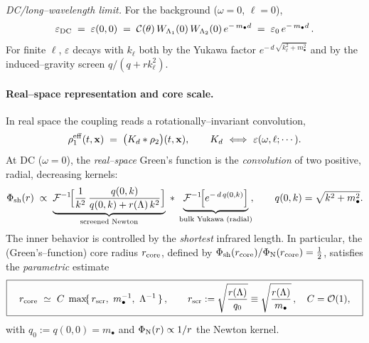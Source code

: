 \documentclass[10pt]{article}
\theoremstyle{definition}
\theoremstyle{plain}
\begin{document}
\emph{DC/long–wavelength limit.} For the background ($\omega=0$, $\ell=0$),
\begin{equation}
\label{eq:eps-DC}
\varepsilon_{\rm DC}\;=\;\varepsilon(0,0)\;=\;\mathcal C(\theta)\,W_{\Lambda_1}(0)\,W_{\Lambda_2}(0)\,
e^{-\,m_\bullet d}\;=\;\varepsilon_0\,e^{-\,m_\bullet d}\,.
\end{equation}
For finite $\ell$, $\varepsilon$ decays with $k_\ell$ both by the Yukawa factor
$e^{-\,d\,\sqrt{k_\ell^2+m_\bullet^2}}$ and by the induced–gravity screen
$q/(q+r k_\ell^2)$.

\paragraph{Real–space representation and core scale.}\label{par:uom-main-067}
In real space the coupling reads a rotationally–invariant convolution,
\begin{equation}
\label{eq:mirage-convolution}
\rho^{\rm eff}_1(t,\mathbf x)\;=\;\big(K_d * \rho_2\big)(t,\mathbf x),
\qquad
K_d\ \Longleftrightarrow\ \varepsilon(\omega,\ell;\cdots).
\end{equation}
At DC ($\omega=0$), the \emph{real–space} Green’s function is the \emph{convolution}
of two positive, radial, decreasing kernels:
\begin{equation}
\label{eq:conv-kernels}
\Phi_{\rm sh}(r)\;\propto\;\underbrace{\mathcal F^{-1}\!\Big[\frac{1}{k^2}\,\frac{q(0,k)}{q(0,k)+r(\Lambda)\,k^2}\Big]}_{\text{screened Newton}}\;\ast\;
\underbrace{\mathcal F^{-1}\!\Big[e^{-\,d\,q(0,k)}\Big]}_{\text{bulk Yukawa (radial)}}\!,
\qquad q(0,k)=\sqrt{k^2+m_\bullet^2}.
\end{equation}
The inner behavior is controlled by the \emph{shortest} infrared length. In
particular, the (Green’s–function) core radius $r_{\rm core}$, defined by
$\Phi_{\rm sh}(r_{\rm core})/\Phi_{\rm N}(r_{\rm core})=\tfrac12$, satisfies the
\emph{parametric} estimate
\begin{equation}
\label{eq:rcore-param}
\boxed{\quad
r_{\rm core}\ \simeq\ C\;\max\!\{\,r_{\rm scr},\ m_\bullet^{-1},\ \Lambda^{-1}\,\}\,,\qquad
r_{\rm scr}:=\sqrt{\frac{r(\Lambda)}{q_0}}\equiv \sqrt{\frac{r(\Lambda)}{m_\bullet}}\,,\quad
C=\mathcal O(1),
\quad}
\end{equation}
with $q_0:=q(0,0)=m_\bullet$ and $\Phi_{\rm N}(r)\propto 1/r$ the Newton kernel.  %
\end{document}
